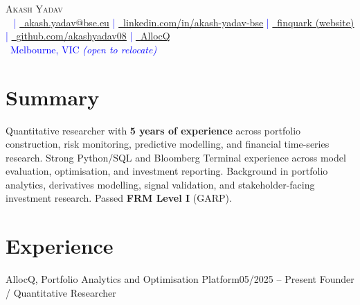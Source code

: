 
\begin{center}
    {\Huge \scshape Akash Yadav} \\[3pt]
    \footnotesize
    \textcolor{blue}{
        \raisebox{-0.1\height}\faPhone\ \underline{\href{tel:\phonenum}{\phonenum}} | 
        \href{mailto:akash.yadav@bse.eu}{\raisebox{-0.2\height}\faEnvelope\  \underline{akash.yadav@bse.eu}} | 
        \href{https://www.linkedin.com/in/akash-yadav-bse}{\raisebox{-0.2\height}\faLinkedin\ \underline{linkedin.com/in/akash-yadav-bse}} |
        \href{https://finquark.my.canva.site/}
        {\raisebox{-0.2\height}\faGlobe\ \underline{finquark (website)}} |
        \href{https://github.com/akashyadav08}
        {\raisebox{-0.2\height}\faGithub\ \underline{github.com/akashyadav08}} |
        \href{https://www.allocq.com/}
        {\raisebox{-0.1\height}\faAllocQ\ \underline{AllocQ}}  \\
        {\raisebox{-0.1\height}\faMapMarker\ Melbourne, VIC}
        \textit{(open to relocate)}
    }
\end{center}
\vspace{0pt}
\section*{Summary}
\noindent
\small
\justifying %
Quantitative researcher with \textbf{5 years of experience} across portfolio construction, risk monitoring, predictive modelling, and financial time-series research. Strong Python/SQL and Bloomberg Terminal experience across model evaluation, optimisation, and investment reporting. Background in portfolio analytics, derivatives modelling, signal validation, and stakeholder-facing investment research. Passed \textbf{FRM Level I} (GARP).

\vspace{0pt}
\section{Experience}
  \resumeSubHeadingListStart
\vspace{6pt}
    \resumeSubheading
      {AllocQ, Portfolio Analytics and Optimisation Platform}{05/2025 -- Present}
      {Founder / Quantitative Researcher}{}
      \vspace{-2pt}
      \resumeItemListStart
       \justifying %

